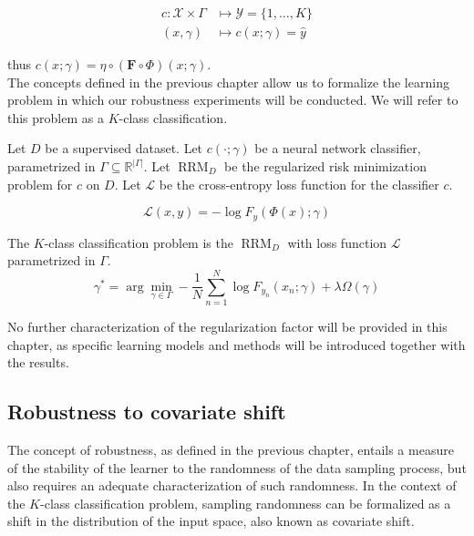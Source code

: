 $$
    \begin{aligned}
    c: \mathcal{X} \times \Gamma & \longmapsto \mathcal{Y} = \{1, \dots, K \} \\
    (x, \gamma) & \longmapsto c(x; \gamma) = \hat{y}
    \end{aligned}
$$

thus $c(x; \gamma) = \eta \circ (\bm{F} \circ \Phi)(x; \gamma)$. \\

The concepts defined in the previous chapter allow us to 
formalize the learning problem in which our robustness experiments
will be conducted. We will refer to this problem as a 
$K$-class classification.

\begin{definition}
    Let $D$ be a supervised dataset.
    Let $c(\cdot; \gamma)$ be a neural network classifier, parametrized
    in $\Gamma \subseteq \mathbb{R}^{|\Gamma|}$.
    Let $\operatorname{RRM}_D$ be the regularized risk minimization problem for $c$ on $D$.
    Let $\mathcal{L}$ be the cross-entropy loss function for the classifier $c$.

    $$
    \mathcal{L}(x, y) = - \log F_y(\Phi(x); \gamma)
    $$

    The $K$-class classification problem is the $\operatorname{RRM}_D$ 
    with loss function $\mathcal{L}$ parametrized in $\Gamma$. 
    $$
        \gamma^* = \arg \min_{\gamma \in \Gamma} - \frac{1}{N}\sum_{n=1}^{N} \log F_{y_n}(x_n; \gamma) + \lambda \Omega(\gamma)
    $$

\end{definition}

No further characterization of the regularization factor will be provided
in this chapter, as specific learning models and methods will be introduced
together with the results.

\subsection{Robustness to covariate shift}\label{sec:robustness_to_covariate_shift}

The concept of robustness, as defined in the previous chapter, entails
a measure of the stability of the learner to the randomness of
the data sampling process, but also requires an adequate characterization
of such randomness. In the context of the $K$-class classification
problem, sampling randomness can be formalized as a shift in the
distribution of the input space, also known as covariate shift. 

